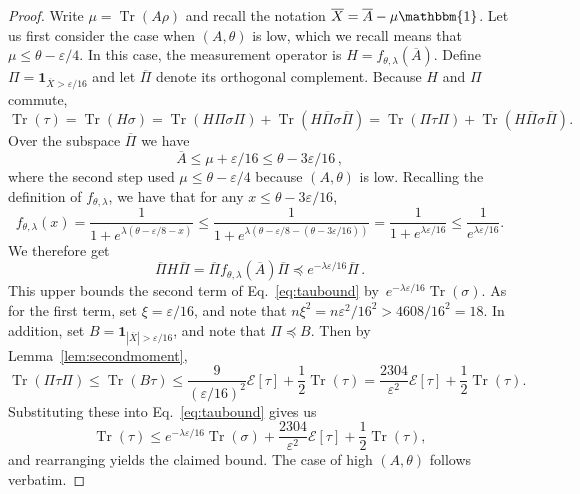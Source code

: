 \documentclass[10pt]{article}
\newcommand{\eps}{\epsilon}
\renewcommand{\epsilon}{\varepsilon}
\newcommand{\energy}{\mathcal{E}}
\DeclareMathOperator{\Tr}{Tr}
\newcommand{\Id}{\mathbbm{1}}
\newcommand{\lift}[1]{\overline{#1}}
\begin{document}
\begin{proof}
    Write $\mu = \Tr(A\rho)$ and recall the notation $\lift{X} = \lift{A} - \mu \Id$.
    Let us first consider the case when $(A,\theta)$ is low, which we recall means that $\mu \leq \theta - \eps/4$.
    In this case, the measurement operator is $H = f_{\theta,\lambda}(\lift{A})$. Define $\Pi = \mathbf{1}_{\lift{X} > \epsilon/16}$ and let $\overline{\Pi}$ denote its orthogonal complement. Because $H$ and $\Pi$ commute,
    \begin{equation}
        \Tr(\tau) = \Tr(H\sigma) = \Tr(H\Pi\sigma\Pi) + \Tr(H\overline{\Pi}\sigma\overline{\Pi}) = \Tr(\Pi\tau\Pi) + \Tr(H\overline{\Pi}\sigma\overline{\Pi}). \label{eq:taubound}
    \end{equation}
    Over the subspace $\overline{\Pi}$ we have
    \begin{equation}
        \overline{A} \le \mu + \epsilon/16 \le \theta - 3\epsilon/16\,,
    \end{equation}
    where the second step used $\mu \leq \theta - \eps/4$ because $(A, \theta)$ is low.
    Recalling the definition of $f_{\theta,\lambda}$, we have that for any $x \leq \theta - 3\eps/16$,
    \begin{equation*}
        f_{\theta,\lambda}(x)
        = \frac{1}{1 + e^{\lambda(\theta - \epsilon/8 - x)}}
        \leq \frac{1}{1 + e^{\lambda(\theta - \epsilon/8 - (\theta - 3\eps/16))}}
        = \frac{1}{1 + e^{\lambda \eps/16}}
        \leq \frac{1}{e^{\lambda \eps/16}}.
    \end{equation*}
    We therefore get
    \begin{equation*}
    \overline{\Pi} H \overline{\Pi} = \overline{\Pi} f_{\theta,\lambda}(\lift{A})\overline{\Pi}
    \preceq e^{-\lambda\epsilon/16}\overline{\Pi}\,.    
    \end{equation*} 
    This upper bounds the second term of Eq.~\eqref{eq:taubound} by~$e^{-\lambda \epsilon/16} \Tr(\sigma)$.
    As for the first term, set $\xi = \epsilon/16$, and note that $n \xi^2 = n \epsilon^2 /16^2 > 4608 / 16^2 = 18$.
    In addition, set $B = \mathbf{1}_{|\lift{X}| > \epsilon/16}$, and note that $\Pi \preceq B$.
    Then by Lemma~\ref{lem:secondmoment},
    \begin{equation*}
        \Tr(\Pi \tau \Pi) \leq \Tr(B \tau) \le \frac{9}{(\epsilon/16)^2}\energy[\tau] + \frac{1}{2} \Tr(\tau)
        = \frac{2304}{\epsilon^2} \energy[\tau] + \frac{1}{2} \Tr(\tau).
    \end{equation*}
    Substituting these into Eq.~\eqref{eq:taubound} gives us
    \begin{equation*}
        \Tr(\tau) \leq e^{-\lambda \epsilon/16} \Tr(\sigma) + \frac{2304}{\epsilon^2} \energy[\tau] + \frac{1}{2} \Tr(\tau),
    \end{equation*}
    and rearranging yields the claimed bound. The case of high $(A,\theta)$ follows verbatim.
\end{proof}
\end{document}
